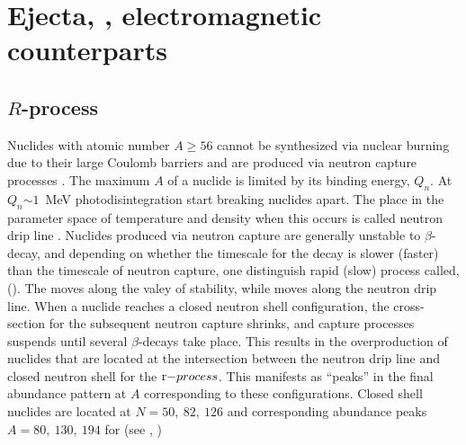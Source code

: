 \section{Ejecta, \nuc{}, electromagnetic counterparts}

\subsection{$R$-process \nuc{}}

Nuclides with atomic number  $A{\geq}56$ cannot be synthesized via nuclear burning 
due to their large Coulomb barriers and are produced via 
neutron capture processes \citep{Burbidge:1957}.
The maximum $A$ of a nuclide is limited by its binding energy, $Q_n$. 
At $Q_n{\sim1}$~MeV photodisintegration start breaking nuclides apart. 
The place in the parameter space of temperature and density when this occurs 
is called neutron drip line \citep{Rolfs:1988}.
Nuclides produced via neutron capture are generally unstable to $\beta$-decay,
and depending on whether the timescale for the decay is slower (faster) than 
the timescale of neutron capture, one distinguish rapid (slow) process called,
\rproc{} (\sproc{}).
%
The \sproc{} moves along the valey of stability, while \rproc{} moves along the 
neutron drip line.
%
When a nuclide reaches a closed neutron shell configuration, the cross-section 
for the subsequent neutron capture shrinks, and capture processes suspends until 
several $\beta$-decays take place. This results in the overproduction of nuclides 
that are located at the intersection between the neutron drip line and closed 
neutron shell for the $\rproc$. This manifests as ``peaks'' in the final abundance 
pattern at $A$ corresponding to these configurations.
Closed shell nuclides are located at $N=50,\: 82, \: 126$ and 
corresponding abundance peaks $A=80,\:130,\:194$ for \rproc{} 
(see \eg, \citet{Arnould:2007gh})

